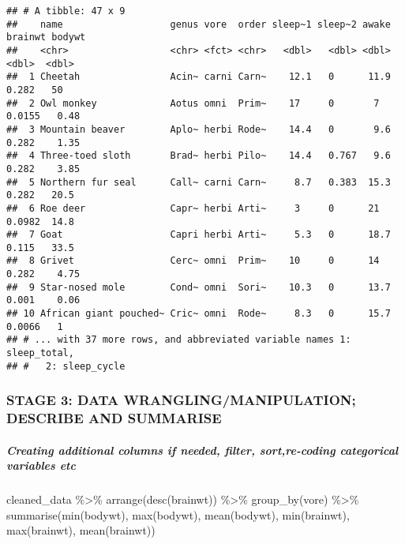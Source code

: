 \documentclass[
]{article}
\newenvironment{Shaded}{\begin{snugshade}}{\end{snugshade}}
\newcommand{\FunctionTok}[1]{\textcolor[rgb]{0.00,0.00,0.00}{#1}}
\newcommand{\NormalTok}[1]{#1}
\newcommand{\SpecialCharTok}[1]{\textcolor[rgb]{0.00,0.00,0.00}{#1}}
\begin{document}
\begin{verbatim}
## # A tibble: 47 x 9
##    name                   genus vore  order sleep~1 sleep~2 awake brainwt bodywt
##    <chr>                  <chr> <fct> <chr>   <dbl>   <dbl> <dbl>   <dbl>  <dbl>
##  1 Cheetah                Acin~ carni Carn~    12.1   0      11.9  0.282   50   
##  2 Owl monkey             Aotus omni  Prim~    17     0       7    0.0155   0.48
##  3 Mountain beaver        Aplo~ herbi Rode~    14.4   0       9.6  0.282    1.35
##  4 Three-toed sloth       Brad~ herbi Pilo~    14.4   0.767   9.6  0.282    3.85
##  5 Northern fur seal      Call~ carni Carn~     8.7   0.383  15.3  0.282   20.5 
##  6 Roe deer               Capr~ herbi Arti~     3     0      21    0.0982  14.8 
##  7 Goat                   Capri herbi Arti~     5.3   0      18.7  0.115   33.5 
##  8 Grivet                 Cerc~ omni  Prim~    10     0      14    0.282    4.75
##  9 Star-nosed mole        Cond~ omni  Sori~    10.3   0      13.7  0.001    0.06
## 10 African giant pouched~ Cric~ omni  Rode~     8.3   0      15.7  0.0066   1   
## # ... with 37 more rows, and abbreviated variable names 1: sleep_total,
## #   2: sleep_cycle
\end{verbatim}

\hypertarget{stage-3-data-wranglingmanipulation-describe-and-summarise}{%
\subsubsection{STAGE 3: DATA WRANGLING/MANIPULATION; DESCRIBE AND
SUMMARISE}\label{stage-3-data-wranglingmanipulation-describe-and-summarise}}

\hypertarget{creating-additional-columns-if-needed-filter-sortre-coding-categorical-variables-etc}{%
\subparagraph{Creating additional columns if needed, filter,
sort,re-coding categorical variables
etc}\label{creating-additional-columns-if-needed-filter-sortre-coding-categorical-variables-etc}}

\begin{Shaded}
\begin{Highlighting}[]
\NormalTok{cleaned\_data }\SpecialCharTok{\%\textgreater{}\%} 
  \FunctionTok{arrange}\NormalTok{(}\FunctionTok{desc}\NormalTok{(brainwt)) }\SpecialCharTok{\%\textgreater{}\%} 
  \FunctionTok{group\_by}\NormalTok{(vore) }\SpecialCharTok{\%\textgreater{}\%} 
  \FunctionTok{summarise}\NormalTok{(}\FunctionTok{min}\NormalTok{(bodywt), }\FunctionTok{max}\NormalTok{(bodywt), }\FunctionTok{mean}\NormalTok{(bodywt),}
            \FunctionTok{min}\NormalTok{(brainwt), }\FunctionTok{max}\NormalTok{(brainwt), }\FunctionTok{mean}\NormalTok{(brainwt))}
\end{Highlighting}
\end{Shaded}
\end{document}
